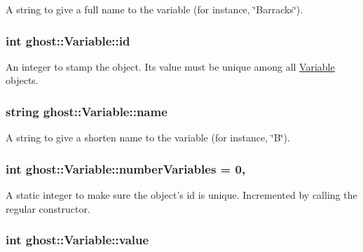 A string to give a full name to the variable (for instance, \char`\"{}\-Barracks\char`\"{}). 

\hypertarget{classghost_1_1Variable_a3b1cd0e87cecbb58e115a9000be26f28}{
\subsubsection[{id}]{\setlength{\rightskip}{0pt plus 5cm}int ghost\-::\-Variable\-::id\hspace{0.3cm}{\ttfamily [protected]}}}\label{classghost_1_1Variable_a3b1cd0e87cecbb58e115a9000be26f28}


An integer to stamp the object. Its value must be unique among all \hyperlink{classghost_1_1Variable}{Variable} objects. 

\hypertarget{classghost_1_1Variable_a05cf4a4cd3a5c033028e0b0f11d1dafd}{
\subsubsection[{name}]{\setlength{\rightskip}{0pt plus 5cm}string ghost\-::\-Variable\-::name\hspace{0.3cm}{\ttfamily [protected]}}}\label{classghost_1_1Variable_a05cf4a4cd3a5c033028e0b0f11d1dafd}


A string to give a shorten name to the variable (for instance, \char`\"{}\-B\char`\"{}). 

\hypertarget{classghost_1_1Variable_a6c9862568c3f951afc4ef8dc75b874cf}{
\subsubsection[{number\-Variables}]{\setlength{\rightskip}{0pt plus 5cm}int ghost\-::\-Variable\-::number\-Variables = 0\hspace{0.3cm}{\ttfamily [static]}, {\ttfamily [private]}}}\label{classghost_1_1Variable_a6c9862568c3f951afc4ef8dc75b874cf}


A static integer to make sure the object's id is unique. Incremented by calling the regular constructor. 

\hypertarget{classghost_1_1Variable_a4623be8dd7ed2a0cb7033aec42033cb7}{
\subsubsection[{value}]{\setlength{\rightskip}{0pt plus 5cm}int ghost\-::\-Variable\-::value\hspace{0.3cm}{\ttfamily [protected]}}}\label{classghost_1_1Variable_a4623be8dd7ed2a0cb7033aec42033cb7}


